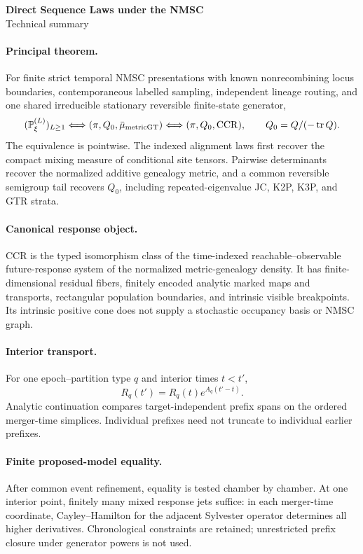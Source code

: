 \documentclass[10pt]{article}
\begin{document}
\begin{center}
{\Large\bfseries Direct Sequence Laws under the NMSC}\\[3pt]
{\large Technical summary}
\end{center}

\paragraph{Principal theorem.}
For finite strict temporal NMSC presentations with known nonrecombining locus boundaries, contemporaneous labelled sampling, independent lineage routing, and one shared irreducible stationary reversible finite-state generator,
\[
(\mathbb P_\xi^{(L)})_{L\ge1}
\Longleftrightarrow
(\pi,Q_0,\bar\mu_{\rm metricGT})
\Longleftrightarrow
(\pi,Q_0,\operatorname{CCR}),
\qquad Q_0=Q/(-\operatorname{tr}Q).
\]
The equivalence is pointwise. The indexed alignment laws first recover the compact mixing measure of conditional site tensors. Pairwise determinants recover the normalized additive genealogy metric, and a common reversible semigroup tail recovers $Q_0$, including repeated-eigenvalue JC, K2P, K3P, and GTR strata.

\paragraph{Canonical response object.}
CCR is the typed isomorphism class of the time-indexed reachable--observable future-response system of the normalized metric-genealogy density. It has finite-dimensional residual fibers, finitely encoded analytic marked maps and transports, rectangular population boundaries, and intrinsic visible breakpoints. Its intrinsic positive cone does not supply a stochastic occupancy basis or NMSC graph.

\paragraph{Interior transport.}
For one epoch--partition type $q$ and interior times $t<t'$,
\[
R_q(t')=R_q(t)e^{A_q(t'-t)}.
\]
Analytic continuation compares target-independent prefix spans on the ordered merger-time simplices. Individual prefixes need not truncate to individual earlier prefixes.

\paragraph{Finite proposed-model equality.}
After common event refinement, equality is tested chamber by chamber. At one interior point, finitely many mixed response jets suffice: in each merger-time coordinate, Cayley--Hamilton for the adjacent Sylvester operator determines all higher derivatives. Chronological constraints are retained; unrestricted prefix closure under generator powers is not used.
\end{document}
